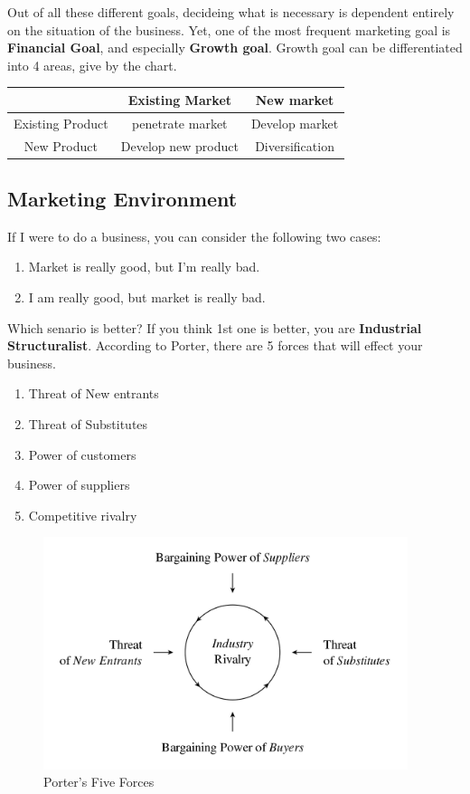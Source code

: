 \documentclass[12pt]{article}
\begin{document}
Out of all these different goals, decideing what is necessary is dependent entirely on the situation of the business. Yet, one of the most frequent marketing goal is \textbf{Financial Goal}, and especially \textbf{Growth goal}. Growth goal can be differentiated into 4 areas, give by the chart.

\begin{tabular}{ |c|c|c| }
	\hline
  	& Existing Market & New market \\ [2ex]
	\hline
	Existing Product & penetrate market & Develop market \\ [2ex]
	\hline
	New Product & Develop new product & Diversification \\ [2ex]
	\hline
\end{tabular}

\subsection{Marketing Environment}
If I were to do a business, you can consider the following two cases:
\begin{enumerate}
	\item Market is really good, but I'm really bad.
	\item I am really good, but market is really bad.
\end{enumerate}

Which senario is better? If you think 1st one is better, you are \textbf{Industrial Structuralist}.
According to Porter, there are 5 forces that will effect your business.
\begin{enumerate}
	\item Threat of New entrants
	\item Threat of Substitutes
	\item Power of customers
	\item Power of suppliers
	\item Competitive rivalry
\end{enumerate}

\begin{figure}[H]
	\centering
	\includegraphics[width=0.95\textwidth]{img/porter5.png}
	\caption{Porter's Five Forces}
	\label{}
\end{figure}
\end{document}

